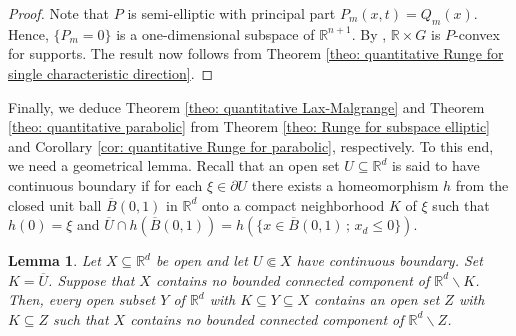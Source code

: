 \documentclass[12pt]{amsart}
\newcommand{\R}{\mathbb{R}}
\newtheorem{lemma}[theorem]{Lemma}
\theoremstyle{definition}
\theoremstyle{remark}
\numberwithin{equation}{section}
\begin{document}
\begin{proof} Note that $P$ is semi-elliptic with principal part $P_m(x,t) = Q_m(x)$. Hence, $\{P_m=0\}$ is a one-dimensional subspace of $\R^{n+1}$. By  \cite[Corollary 5]{Kalmes19}, $\R \times G$ is $P$-convex for supports. The result now follows from Theorem \ref{theo: quantitative Runge for single characteristic direction}.
\end{proof}
 

Finally, we deduce Theorem \ref{theo: quantitative Lax-Malgrange} and  Theorem \ref{theo: quantitative parabolic} from Theorem \ref{theo: Runge for subspace elliptic} and Corollary \ref{cor: quantitative Runge for parabolic}, respectively. To this end, we need a geometrical lemma. Recall that an open  set $U \subseteq \R^d$ is said to have continuous boundary if for each $\xi \in \partial U$ there exists a homeomorphism  $h$ from the closed unit ball $\overline{B}(0,1)$ in $\R^d$ onto a compact neighborhood $K$ of $\xi$ such that $h(0) = \xi$ and  $\overline{U} \cap h\left(\overline{B}(0,1)\right)= h\left(\{x\in \overline{B}(0,1)\, ; \,x_d\leq 0\}\right)$.
\begin{lemma}\label{lem: geometric} 
		Let $X\subseteq\R^d$ be open and let $U \Subset X$ have continuous boundary. Set $K = \overline{U}$. Suppose that $X$ contains no bounded connected component of $\R^d\backslash K$. Then, every open subset $Y$ of $\R^d$ with $K\subseteq Y\subseteq X$ contains an open set $Z$ with $K\subseteq Z$ such  that  $X$ contains no bounded connected component of $\R^d\backslash Z$.
\end{lemma}
\end{document}
